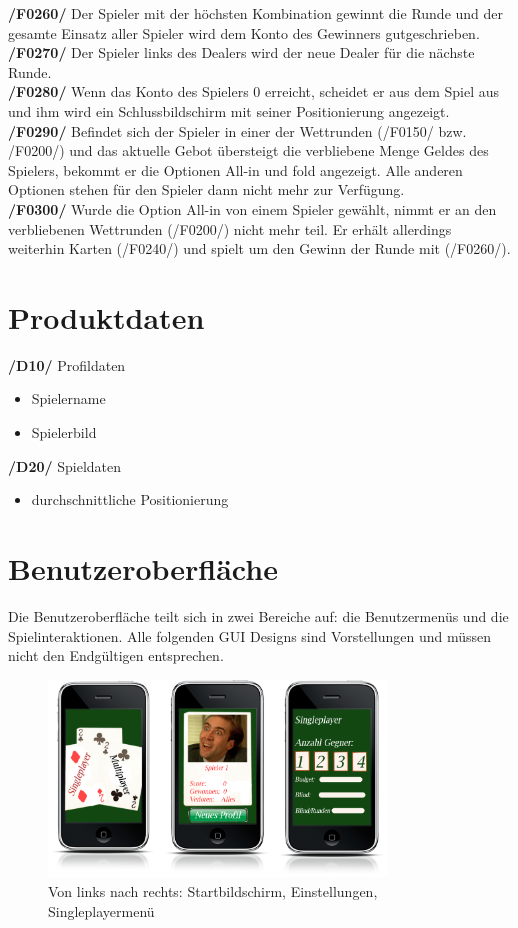 \documentclass[a4paper,12pt,bibtotoc, parskip=full]{article}
\begin{document}
\textbf{/F0260/} Der Spieler mit der höchsten Kombination gewinnt die Runde und der gesamte Einsatz aller Spieler wird dem Konto des Gewinners gutgeschrieben.\\
\textbf{/F0270/} Der Spieler links des Dealers wird der neue Dealer für die nächste Runde.\\
\textbf{/F0280/} Wenn das Konto des Spielers 0 erreicht, scheidet er aus dem Spiel aus und ihm wird ein Schlussbildschirm mit seiner Positionierung angezeigt.\\
\textbf{/F0290/} Befindet sich der Spieler in einer der Wettrunden (/F0150/ bzw. /F0200/) und das aktuelle Gebot übersteigt die verbliebene Menge Geldes des Spielers, bekommt er die Optionen All-in und fold angezeigt. Alle anderen Optionen stehen für den Spieler dann nicht mehr zur Verfügung.\\
\textbf{/F0300/} Wurde die Option All-in von einem Spieler gewählt, nimmt er an den verbliebenen Wettrunden (/F0200/) nicht mehr teil. Er erhält allerdings weiterhin Karten (/F0240/) und spielt um den Gewinn der Runde mit (/F0260/).
\newpage

\section{Produktdaten}
\textbf{/D10/} Profildaten
\begin{itemize}
\item Spielername
\item Spielerbild
\end{itemize}
\textbf{/D20/} Spieldaten
\begin{itemize}
\item durchschnittliche Positionierung
\end{itemize}
\newpage

\section{Benutzeroberfläche}
Die Benutzeroberfläche teilt sich in zwei Bereiche auf: die Benutzermenüs und die Spielinteraktionen. Alle folgenden GUI Designs sind Vorstellungen und müssen nicht den Endgültigen entsprechen.

\begin{figure}[!h]
    \centering
    \includegraphics[width=0.8\textwidth]{Fig1}%
\caption{Von links nach rechts: Startbildschirm, Einstellungen, Singleplayermenü}
\end{figure} 
\end{document}
